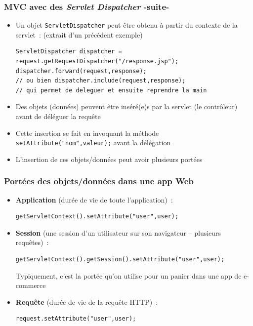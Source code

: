 \documentclass{beamer}
\begin{document}
\begin{frame}[fragile]
	\frametitle{MVC avec des \textit{Servlet Dispatcher} -suite-}
	\begin{itemize}
		\item Un objet \texttt{ServletDispatcher} peut être obtenu à partir du contexte de la servlet~: (extrait d'un précédent exemple)
\begin{lstlisting}
ServletDispatcher dispatcher = request.getRequestDispatcher("/response.jsp");
dispatcher.forward(request,response);
// ou bien dispatcher.include(request,response);
// qui permet de deleguer et ensuite reprendre la main
\end{lstlisting}
		\item Des objets (données) peuvent être inséré(e)s par la servlet (le contrôleur) avant de déléguer la requête
		\item Cette insertion se fait en invoquant la méthode \texttt{setAttribute("nom",valeur);} avant la délégation
		\item L'insertion de ces objets/données peut avoir plusieurs portées
	\end{itemize}
\end{frame}

\begin{frame}[fragile]
	\frametitle{Portées des objets/données dans une app Web}
	\begin{itemize}
		\item \textbf{Application} (durée de vie de toute l'application)~:
\begin{lstlisting}
getServletContext().setAttribute("user",user);
\end{lstlisting}
		\item \textbf{Session} (une session d'un utilisateur sur son navigateur -- plusieurs requêtes)~:
\begin{lstlisting}
getServletContext().getSession().setAttribute("user",user);	
\end{lstlisting}			
		Typiquement, c'est la portée qu'on utilise pour un panier dans une app de e-commerce 
		\item \textbf{Requête} (durée de vie de la requête HTTP)~:\\
\begin{lstlisting}
request.setAttribute("user",user);	
\end{lstlisting}					
	\end{itemize}
\end{frame}
\end{document}
